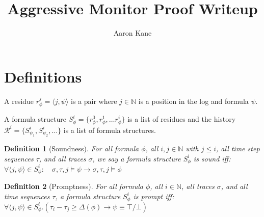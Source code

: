 \documentclass[10pt,a4paper]{article}
\title{Aggressive Monitor Proof Writeup}
\author{Aaron Kane}
\newcommand{\rp}[2]{\ensuremath{\langle #1, #2 \rangle}}
\newcommand{\res}[2]{\ensuremath{r_{#1}^{#2}}}
\newtheorem{tdef}{Definition}
\begin{document}
\maketitle

\section{Definitions}

A residue $\res{\phi}{j} = \rp{j}{\psi}$ is a pair where $j \in \mathbb{N}$ is a position in the log and formula $\psi$.

A formula structure $S_{\phi}^i = \{ r_{\phi}^0, r_{\phi}^1, \ldots r_{\phi}^i \}$ is a list of residues and the history $\mathcal{R}^i = \{ S_{\psi_1}^i, S_{\psi_2}^i,\ldots \}$ is a list of formula structures.



%
\begin{tdef}[Soundness] For all formula $\phi$, all $i,j \in \mathbb{N}$ with $j \leq i$, all time step sequences $\tau$, and all traces $\sigma$, we say a formula structure $S^i_{\phi}$ is sound iff:
$\forall \rp{j}{\psi} \in S^i_{\phi}: \quad \sigma, \tau, j \vDash \psi \rightarrow \sigma, \tau, j \vDash \phi$
\end{tdef}


\begin{tdef}[Promptness]
For all formula $\phi$, all $i \in \mathbb{N}$, all traces $\sigma$, and all time sequences $\tau$, a formula structure $S^i_{\phi}$ is prompt iff: 
$\forall \rp{j}{\psi} \in S^i_{\phi}.( \tau_i - \tau_j \geq \Delta(\phi) \rightarrow \psi \equiv \top/\bot)$
\end{tdef}
\end{document}
